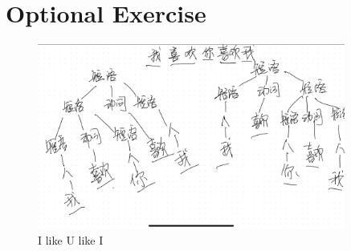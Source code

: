 \documentclass[onecolumn,oneside]{SUSTechHomework}
\begin{document}
  \section{Optional Exercise}

    \begin{figure}[H]
        \centering
        \includegraphics[width=0.9\textwidth]{img/like.jpeg}
        \caption{I like U like I}
    \end{figure}
\end{document}
